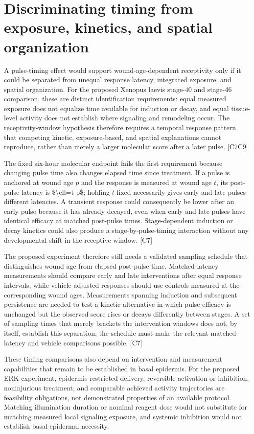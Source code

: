\documentclass[11pt]{article}
\begin{document}
\section{Discriminating timing from exposure, kinetics, and spatial organization}
A pulse-timing effect would support wound-age-dependent receptivity only if it could be separated from unequal response latency, integrated exposure, and spatial organization. For the proposed Xenopus laevis stage-40 and stage-46 comparison, these are distinct identification requirements: equal measured exposure does not equalize time available for induction or decay, and equal tissue-level activity does not establish where signaling and remodeling occur. The receptivity-window hypothesis therefore requires a temporal response pattern that competing kinetic, exposure-based, and spatial explanations cannot reproduce, rather than merely a larger molecular score after a later pulse. [C7\textendash{}C9]

The fixed six-hour molecular endpoint fails the first requirement because changing pulse time also changes elapsed time since treatment. If a pulse is anchored at wound age $p$ and the response is measured at wound age $t$, its post-pulse latency is \$\textbackslash{}ell=t-p\$; holding $t$ fixed necessarily gives early and late pulses different latencies. A transient response could consequently be lower after an early pulse because it has already decayed, even when early and late pulses have identical efficacy at matched post-pulse times. Stage-dependent induction or decay kinetics could also produce a stage-by-pulse-timing interaction without any developmental shift in the receptive window. [C7]

The proposed experiment therefore still needs a validated sampling schedule that distinguishes wound age from elapsed post-pulse time. Matched-latency measurements should compare early and late interventions after equal response intervals, while vehicle-adjusted responses should use controls measured at the corresponding wound ages. Measurements spanning induction and subsequent persistence are needed to test a kinetic alternative in which pulse efficacy is unchanged but the observed score rises or decays differently between stages. A set of sampling times that merely brackets the intervention windows does not, by itself, establish this separation; the schedule must make the relevant matched-latency and vehicle comparisons possible. [C7]

These timing comparisons also depend on intervention and measurement capabilities that remain to be established in basal epidermis. For the proposed ERK experiment, epidermis-restricted delivery, reversible activation or inhibition, noninjurious treatment, and comparable achieved activity trajectories are feasibility obligations, not demonstrated properties of an available protocol. Matching illumination duration or nominal reagent dose would not substitute for matching measured local signaling exposure, and systemic inhibition would not establish basal-epidermal necessity.
\end{document}
